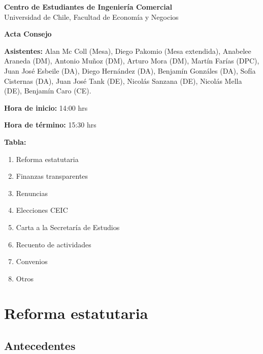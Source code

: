 \documentclass[12pt,letterpaper]{article}
\newif\ifrevision
\newcommand{\dato}[1]{\ifrevision\textcolor[HTML]{C0392B}{#1}\else#1\fi}
\begin{document}
\begin{center}
  {\Large\bfseries Centro de Estudiantes de Ingeniería Comercial}\\
  Universidad de Chile, Facultad de Economía y Negocios

  \vspace{1.2em}
  \textbf{Acta Consejo}
\end{center}

\vspace{0.8em}

\textbf{Asistentes:} \dato{Alan Mc Coll (Mesa), Diego Pakomio (Mesa extendida), Anabelee Araneda (DM), Antonio Muñoz (DM), Arturo Mora (DM), Martín Farías (DPC), Juan José Esbeile (DA), Diego Hernández (DA), Benjamín Gonzáles (DA), Sofía Cisternas (DA), Juan José Tank (DE), Nicolás Sanzana (DE), Nicolás Mella (DE), Benjamín Caro (CE).}

\textbf{Hora de inicio:} 14:00 hrs

\textbf{Hora de término:} \dato{15:30} hrs

\vspace{1em}

\textbf{Tabla:}

\begin{enumerate}[itemsep=6pt]
  \item Reforma estatutaria
  \item Finanzas transparentes
  \item Renuncias
  \item Elecciones CEIC
  \item Carta a la Secretaría de Estudios
  \item Recuento de actividades
  \item Convenios
  \item Otros
\end{enumerate}

\section{Reforma estatutaria}

\subsection{Antecedentes}
\end{document}
